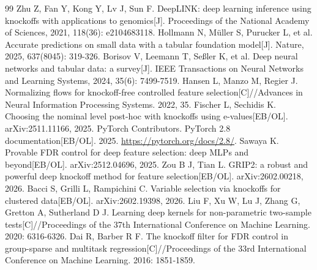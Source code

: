\documentclass{sufethesismas}
\begin{document}
\begin{thebibliography}{99}
 Zhu Z, Fan Y, Kong Y, Lv J, Sun F. DeepLINK: deep learning inference using knockoffs with applications to genomics[J]. Proceedings of the National Academy of Sciences, 2021, 118(36): e2104683118.
 Hollmann N, Müller S, Purucker L, et al. Accurate predictions on small data with a tabular foundation model[J]. Nature, 2025, 637(8045): 319-326.
 Borisov V, Leemann T, Seßler K, et al. Deep neural networks and tabular data: a survey[J]. IEEE Transactions on Neural Networks and Learning Systems, 2024, 35(6): 7499-7519.
 Hansen L, Manzo M, Regier J. Normalizing flows for knockoff-free controlled feature selection[C]//Advances in Neural Information Processing Systems. 2022, 35.
 Fischer L, Sechidis K. Choosing the nominal level post-hoc with knockoffs using e-values[EB/OL]. arXiv:2511.11166, 2025.
 PyTorch Contributors. PyTorch 2.8 documentation[EB/OL]. 2025. \url{https://pytorch.org/docs/2.8/}.
 Sawaya K. Provable FDR control for deep feature selection: deep MLPs and beyond[EB/OL]. arXiv:2512.04696, 2025.
 Zou B J, Tian L. GRIP2: a robust and powerful deep knockoff method for feature selection[EB/OL]. arXiv:2602.00218, 2026.
 Bacci S, Grilli L, Rampichini C. Variable selection via knockoffs for clustered data[EB/OL]. arXiv:2602.19398, 2026.
 Liu F, Xu W, Lu J, Zhang G, Gretton A, Sutherland D J. Learning deep kernels for non-parametric two-sample tests[C]//Proceedings of the 37th International Conference on Machine Learning. 2020: 6316-6326.
 Dai R, Barber R F. The knockoff filter for FDR control in group-sparse and multitask regression[C]//Proceedings of the 33rd International Conference on Machine Learning. 2016: 1851-1859.
\end{thebibliography}
\end{document}
